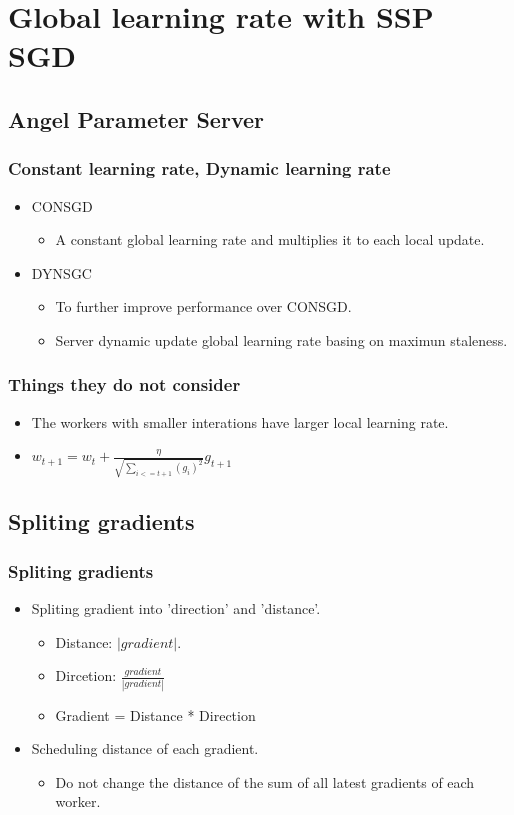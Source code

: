 \section{Global learning rate with SSP SGD}
\subsection{Angel Parameter Server}
\begin{frame}
    \frametitle{Constant learning rate, Dynamic learning rate}
    \begin{itemize}
		\item CONSGD
		\begin{itemize}
			\item A constant global learning rate and multiplies it to each local update.
		\end{itemize}
		\item DYNSGC
		\begin{itemize}
			\item To further improve performance over CONSGD.
			\item Server dynamic update global learning rate basing on maximun staleness.
		\end{itemize}
	\end{itemize}
\end{frame}

\begin{frame}
	\frametitle{Things they do not consider}
	\begin{itemize}
		\item The workers with smaller interations have larger local learning rate.
			\item $w_{t+1} = w_{t}+\frac{\eta}{\sqrt{\sum_{i<=t+1}(g_{i})^2}}g_{t+1}$
	\end{itemize}
\end{frame}

\subsection{Spliting gradients}
\begin{frame}
	\frametitle{Spliting gradients}
	\begin{itemize}
		\item Spliting gradient into 'direction' and 'distance'.
			\begin{itemize}
				\item Distance: $|gradient|$.
				\item Dircetion: $\frac{gradient}{|gradient|}$
				\item Gradient = Distance * Direction
			\end{itemize}
		\item Scheduling distance of each gradient.
		\begin{itemize}
			\item Do not change the distance of the sum of all latest gradients of each worker.
		\end{itemize}
	\end{itemize}
\end{frame}

